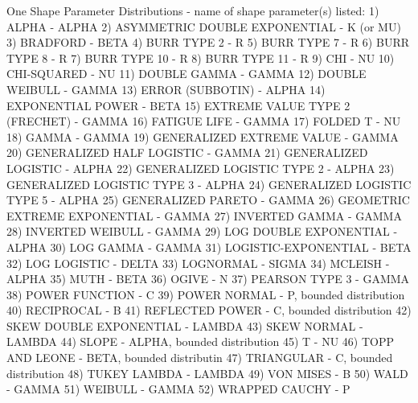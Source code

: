 One Shape Parameter Distributions - name of shape parameter(s) listed:
      1) ALPHA                          - ALPHA
      2) ASYMMETRIC DOUBLE EXPONENTIAL  - K (or MU)
      3) BRADFORD                       - BETA
      4) BURR TYPE 2                    - R
      5) BURR TYPE 7                    - R
      6) BURR TYPE 8                    - R
      7) BURR TYPE 10                   - R
      8) BURR TYPE 11                   - R
      9) CHI                            - NU
     10) CHI-SQUARED                    - NU
     11) DOUBLE GAMMA                   - GAMMA
     12) DOUBLE WEIBULL                 - GAMMA
     13) ERROR (SUBBOTIN)               - ALPHA
     14) EXPONENTIAL POWER              - BETA
     15) EXTREME VALUE TYPE 2 (FRECHET) - GAMMA
     16) FATIGUE LIFE                   - GAMMA
     17) FOLDED T                       - NU
     18) GAMMA                          - GAMMA
     19) GENERALIZED EXTREME VALUE      - GAMMA
     20) GENERALIZED HALF LOGISTIC      - GAMMA
     21) GENERALIZED LOGISTIC           - ALPHA
     22) GENERALIZED LOGISTIC TYPE 2    - ALPHA
     23) GENERALIZED LOGISTIC TYPE 3    - ALPHA
     24) GENERALIZED LOGISTIC TYPE 5    - ALPHA
     25) GENERALIZED PARETO             - GAMMA
     26) GEOMETRIC EXTREME  EXPONENTIAL - GAMMA
     27) INVERTED GAMMA                 - GAMMA
     28) INVERTED WEIBULL               - GAMMA
     29) LOG DOUBLE EXPONENTIAL         - ALPHA
     30) LOG GAMMA                      - GAMMA
     31) LOGISTIC-EXPONENTIAL           - BETA
     32) LOG LOGISTIC                   - DELTA
     33) LOGNORMAL                      - SIGMA
     34) MCLEISH                        - ALPHA
     35) MUTH                           - BETA
     36) OGIVE                          - N
     37) PEARSON TYPE 3                 - GAMMA
     38) POWER FUNCTION                 - C
     39) POWER NORMAL                   - P, bounded distribution
     40) RECIPROCAL                     - B
     41) REFLECTED POWER                - C, bounded distribution
     42) SKEW DOUBLE EXPONENTIAL        - LAMBDA
     43) SKEW NORMAL                    - LAMBDA
     44) SLOPE                          - ALPHA, bounded distribution
     45) T                              - NU
     46) TOPP AND LEONE                 - BETA, bounded distributin
     47) TRIANGULAR                     - C, bounded distribution
     48) TUKEY LAMBDA                   - LAMBDA
     49) VON MISES                      - B
     50) WALD                           - GAMMA
     51) WEIBULL                        - GAMMA
     52) WRAPPED CAUCHY                 - P
    
